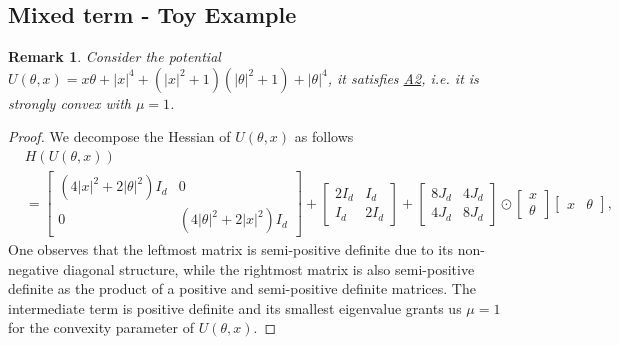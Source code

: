 \documentclass[a4paper, 10pt]{article}
\theoremstyle{plain}%
\newtheorem{remark}{Remark}
\begin{document}
\subsection{Mixed term - Toy Example}
\begin{remark}\label{remark7}
    Consider the potential $U(\theta,x)=x\theta+|x|^4+(|x|^2+1)(|\theta|^2+1)+|\theta|^4$, it satisfies \hyperlink{Assum2}{A2}, i.e. it is strongly convex with $\mu=1$.
\end{remark}
\begin{proof}
We decompose the Hessian of $U(\theta,x)$ as follows
\begin{align*}
&H\left(U(\theta,x)\right)\\&=\begin{bmatrix}
\left(4|x|^2+2|\theta|^2\right) I_{d}& 0\\
0 & \left(4|\theta|^2+2|x|^2\right) I_{d}
\end{bmatrix}+\begin{bmatrix}
2 I_{d}& I_d\\
I_d & 2 I_{d}
\end{bmatrix}+\begin{bmatrix}
8 J_{d}&4 J_d\\
4J_d & 8 J_{d}
\end{bmatrix}\odot \begin{bmatrix}
x\\
\theta 
\end{bmatrix} \begin{bmatrix}
x&\theta
\end{bmatrix},
\end{align*}
One observes that the leftmost matrix is semi-positive definite due to its non-negative diagonal structure, while the rightmost matrix is also semi-positive definite as the product of a positive and semi-positive definite matrices. The intermediate term is positive definite and its smallest eigenvalue grants us $\mu=1$ for the convexity parameter of $U(\theta,x)$.
\end{proof}
\end{document}
